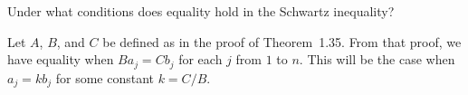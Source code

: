  Under what conditions does equality hold in the Schwartz
inequality?
\begin{solution}
  Let $A$, $B$, and $C$ be defined as in the proof of
  Theorem~1.35. From that proof, we have equality when $Ba_j = Cb_j$
  for each $j$ from $1$ to $n$. This will be the case when
  $a_j = kb_j$ for some constant $k = C/B$.
\end{solution}



